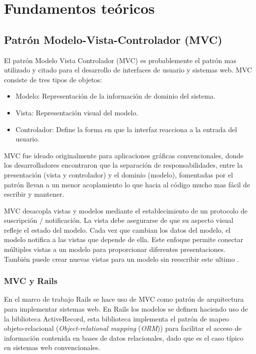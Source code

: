 \chapter{Fundamentos teóricos}

\section{Patrón Modelo-Vista-Controlador (MVC)}
El patrón Modelo Vista Controlador (MVC) es probablemente el patrón
mas utilizado y citado para el desarrollo de interfaces de usuario y sistemas web.
MVC consiste de tres tipos de objetos:

\begin{itemize}
\item Modelo: Representación de la información de dominio del sistema.
\item Vista: Representación visual del modelo.
\item Controlador: Define la forma en que la interfaz reacciona a la entrada
  del usuario.
\end{itemize}


MVC fue ideado originalmente para aplicaciones gráficas convencionales,
donde los desarrolladores encontraron que la separación de responsabilidades,
entre la presentación (vista y controlador) y el dominio (modelo), fomentadas
por el patrón llevan a un menor acoplamiento lo que hacia al código
mucho mas fácil de escribir y mantener.

MVC desacopla vistas y modelos mediante el establecimiento de un
protocolo de suscripción / notificación. La vista debe asegurarse
de que su aspecto visual refleje el estado del modelo. Cada vez que cambian
los datos del modelo, el modelo notifica a las vistas que depende de ella.
Este enfoque permite conectar múltiples vistas a un modelo para proporcionar
diferentes presentaciones. También puede crear nuevas vistas para un modelo
sin reescribir este ultimo \cite[pag.~4]{14_gamma_1995}.

\subsection{MVC y Rails}
En el marco de trabajo Rails se hace uso de MVC como patrón de arquitectura
para implementar sistemas web. En Rails los modelos se definen haciendo
uso de la biblioteca ActiveRecord, esta biblioteca implementa el
patrón de mapeo objeto-relacional (\textit{Object-relational mapping}
(\textit{ORM})) para facilitar el acceso de información contenida en
bases de datos relacionales, dado que es el caso típico en sistemas web
convencionales.

